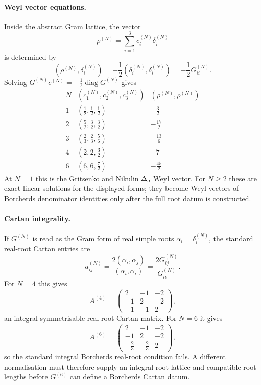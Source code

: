 \paragraph{Weyl vector equations.}
Inside the abstract Gram lattice, the vector
\[
  \rho^{(N)}=\sum_{i=1}^{3}c_i^{(N)}\delta_i^{(N)}
\]
is determined by
\[
  (\rho^{(N)},\delta_i^{(N)})
  =-\frac12(\delta_i^{(N)},\delta_i^{(N)})
  =-\frac12G^{(N)}_{ii}.
\]
Solving $G^{(N)}c^{(N)}=-\tfrac12\operatorname{diag}G^{(N)}$ gives
\[
\begin{array}{c|c|c}
N & (c_1^{(N)},c_2^{(N)},c_3^{(N)})
  & (\rho^{(N)},\rho^{(N)})\\
\hline
1 & (\tfrac12,\tfrac12,\tfrac12) & -\tfrac32\\
2 & (\tfrac52,\tfrac32,\tfrac32) & -\tfrac{17}{2}\\
3 & (\tfrac23,\tfrac23,\tfrac56) & -\tfrac{13}{6}\\
4 & (2,2,\tfrac32) & -7\\
6 & (6,6,\tfrac72) & -\tfrac{45}{2}
\end{array}
\]
At $N=1$ this is the Gritsenko and Nikulin $\Delta_5$ Weyl vector.
For $N\geq2$ these are exact linear solutions for the displayed forms;
they become Weyl vectors of Borcherds denominator identities only after
the full root datum is constructed.

\paragraph{Cartan integrality.}
If $G^{(N)}$ is read as the Gram form of real simple roots
$\alpha_i=\delta_i^{(N)}$, the standard real-root Cartan entries are
\[
  a_{ij}^{(N)}
  =\frac{2(\alpha_i,\alpha_j)}{(\alpha_i,\alpha_i)}
  =\frac{2G^{(N)}_{ij}}{G^{(N)}_{ii}}.
\]
For $N=4$ this gives
\[
  A^{(4)}=
  \begin{pmatrix}
    2&-1&-2\\
    -1&2&-2\\
    -1&-1&2
  \end{pmatrix},
\]
an integral symmetrisable real-root Cartan matrix. For $N=6$ it gives
\[
  A^{(6)}=
  \begin{pmatrix}
    2&-1&-2\\
    -1&2&-2\\
    -\tfrac23&-\tfrac23&2
  \end{pmatrix},
\]
so the standard integral Borcherds real-root condition fails. A
different normalisation must therefore supply an integral root lattice
and compatible root lengths before $G^{(6)}$ can define a Borcherds
Cartan datum.


